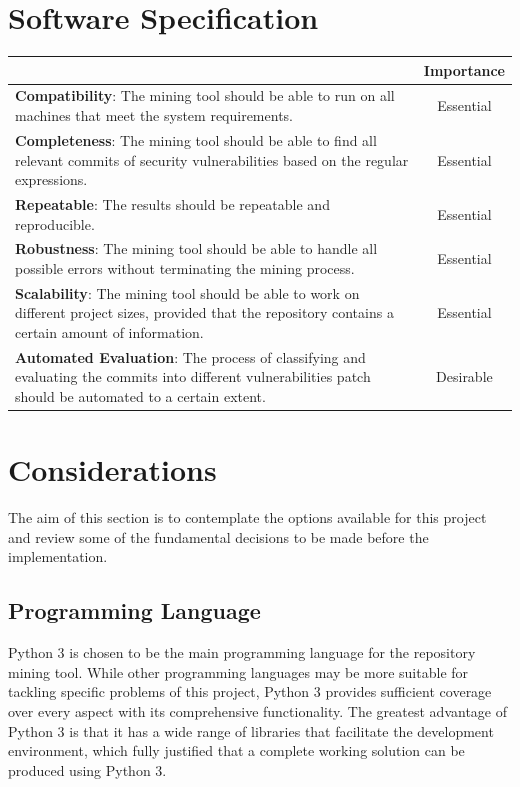 \documentclass[12pt, a4paper]{report}
\begin{document}
{\section{Software Specification}
\begin{table}[H]
	\begin{center}
		\begin{tabular}{|p{9.5cm}|c|}
			\hline
			\rowcolor[HTML]{D8D8D8}
			\multicolumn{1}{|c|}{Criteria} & Importance \\ \hline
			\textbf{Compatibility}: The mining tool should be able to run on all machines that meet the
			system requirements. & Essential \\ \hline
			\textbf{Completeness}: The mining tool should be able to find all relevant commits of security
			vulnerabilities based on the regular expressions. & Essential \\ \hline
			\textbf{Repeatable}: The results should be repeatable and reproducible. & Essential \\ \hline
			\textbf{Robustness}: The mining tool should be able to handle all possible errors without
			terminating the mining process. & Essential \\ \hline
			\textbf{Scalability}: The mining tool should be able to work on different project sizes,
			provided that the repository contains a certain amount of information. & Essential \\ \hline
			\textbf{Automated Evaluation}: The process of classifying and evaluating the commits into
			different vulnerabilities patch should be automated to a certain extent. & Desirable \\ \hline
			\end{tabular}
		 \label{table:criteria}
	\end{center}
\end{table}

\section{Considerations}
The aim of this section is to contemplate the options available for this project and review some of
the fundamental decisions to be made before the implementation.

\subsection{Programming Language}
Python 3 \cite{python} is chosen to be the main programming language for the repository mining tool.
While other programming languages may be more suitable for tackling specific problems of this
project, Python 3 provides sufficient coverage over every aspect with its comprehensive
functionality. The greatest advantage of Python 3 is that it has a wide range of libraries that
facilitate the development environment, which fully justified that a complete working solution can
be produced using Python 3.

}
\end{document}
